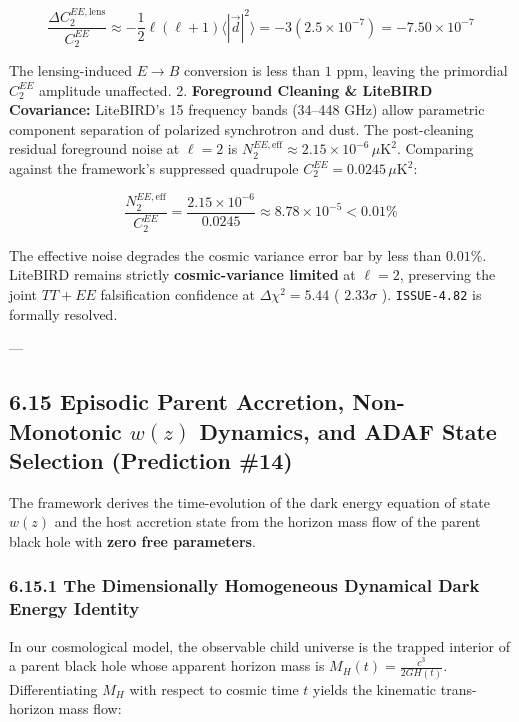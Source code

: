 \documentclass[11pt,a4paper]{article}
\theoremstyle{definition}
\theoremstyle{remark}
\begin{document}
\begin{equation}
\frac{\Delta C_2^{EE, \text{lens}}}{C_2^{EE}} \approx -\frac{1}{2} \ell(\ell+1) \langle |\vec{d}|^2 \rangle = -3 (2.5 \times 10^{-7}) = -7.50 \times 10^{-7}
\end{equation}


The lensing-induced $E \to B$ conversion is less than $1\text{ ppm}$, leaving the primordial $C_2^{EE}$ amplitude unaffected.
2. \textbf{Foreground Cleaning \& LiteBIRD Covariance:} LiteBIRD's 15 frequency bands (34--448 GHz) allow parametric component separation of polarized synchrotron and dust. The post-cleaning residual foreground noise at $\ell = 2$ is $N_2^{EE, \text{eff}} \approx 2.15 \times 10^{-6}\,\mu\text{K}^2$. Comparing against the framework's suppressed quadrupole $C_2^{EE} = 0.0245\,\mu\text{K}^2$:


\begin{equation}
\frac{N_2^{EE, \text{eff}}}{C_2^{EE}} = \frac{2.15 \times 10^{-6}}{0.0245} \approx 8.78 \times 10^{-5} < 0.01\%
\end{equation}


The effective noise degrades the cosmic variance error bar by less than $0.01\%$. LiteBIRD remains strictly \textbf{cosmic-variance limited} at $\ell = 2$, preserving the joint $TT + EE$ falsification confidence at $\Delta\chi^2 = 5.44$ ( $2.33\sigma$ ). \texttt{ISSUE-4.82} is formally resolved.

---

\subsection{6.15 Episodic Parent Accretion, Non-Monotonic $w(z)$ Dynamics, and ADAF State Selection (Prediction \#14)}

The framework derives the time-evolution of the dark energy equation of state $w(z)$ and the host accretion state from the horizon mass flow of the parent black hole with \textbf{zero free parameters}.

\subsubsection{6.15.1 The Dimensionally Homogeneous Dynamical Dark Energy Identity}
In our cosmological model, the observable child universe is the trapped interior of a parent black hole whose apparent horizon mass is $M_H(t) = \frac{c^3}{2 G H(t)}$. Differentiating $M_H$ with respect to cosmic time $t$ yields the kinematic trans-horizon mass flow:
\end{document}
